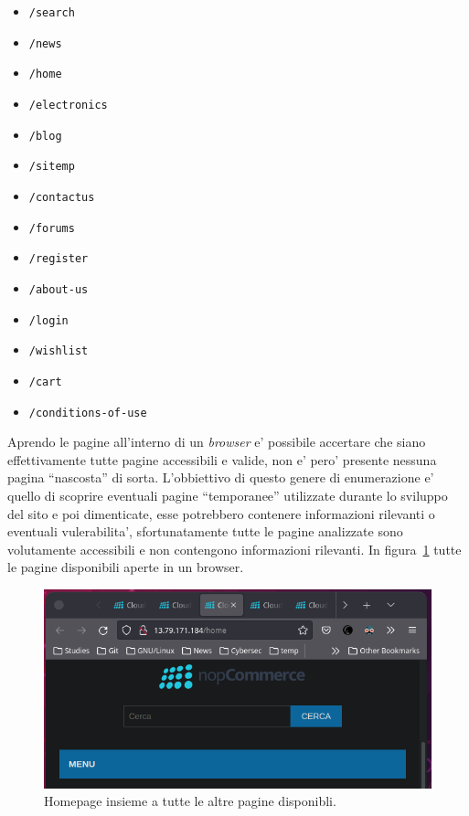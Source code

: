 \documentclass[a4paper]{report}
\newcommand{\quotes}[1]{``#1''}
\begin{document}
			\begin{itemize}
				\item \texttt{/search}
				\item \texttt{/news}
				\item \texttt{/home}
				\item \texttt{/electronics}
				\item \texttt{/blog}
				\item \texttt{/sitemp}
				\item \texttt{/contactus}
				\item \texttt{/forums}
				\item \texttt{/register}
				\item \texttt{/about-us}
				\item \texttt{/login}
				\item \texttt{/wishlist}
				\item \texttt{/cart}
				\item \texttt{/conditions-of-use}
			\end{itemize}
			Aprendo le pagine all'interno di un \emph{browser} e' possibile accertare che siano effettivamente tutte
			pagine accessibili e valide, non e' pero' presente nessuna pagina \quotes{nascosta} di sorta. L'obbiettivo
			di questo genere di enumerazione e' quello di scoprire eventuali pagine \quotes{temporanee} utilizzate
			durante lo sviluppo del sito e poi dimenticate, esse potrebbero contenere informazioni rilevanti o eventuali
			vulerabilita', sfortunatamente tutte le pagine analizzate sono volutamente accessibili e non contengono
			informazioni rilevanti. In figura~\ref{fig:home_page} tutte le pagine disponibili aperte in un browser.

			\begin{figure}[H]
				\includegraphics[width=\textwidth]{HomePage.png}
				\caption{Homepage insieme a tutte le altre pagine disponibli.}\label{fig:home_page}
			\end{figure}
\end{document}
